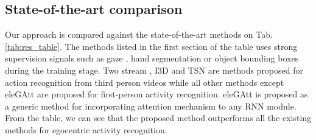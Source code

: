 \documentclass[10pt,twocolumn,letterpaper]{article}
\begin{document}
\label{subsec:spat_att}
































 	\label{sec:exp.ablation}




	












	\subsection{State-of-the-art comparison}
	
	Our approach is compared against the state-of-the-art methods on Tab. \ref{tab:res_table}. The methods listed in the first section of the table uses strong supervision signals such as gaze \cite{li2015delving, li2018eye}, hand segmentation \cite{ma2016deeper} or object bounding boxes \cite{ma2016deeper} during the training stage. Two stream \cite{simonyan2014two}, I3D \cite{carreira2017quo} and TSN \cite{TSN2016ECCV} are methods proposed for action recognition from third person videos while all other methods except eleGAtt \cite{attention_eccv18} are proposed for first-person activity recognition. eleGAtt \cite{attention_eccv18} is proposed as a generic method for incorporating attention mechanism to any RNN module. From the table, we can see that the proposed method outperforms all the existing methods for egocentric activity recognition. 

	




	
	
\end{document}
